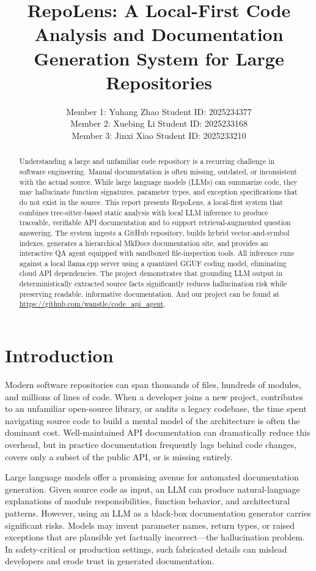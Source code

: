 \documentclass[10pt,twocolumn]{article}
\title{RepoLens: A Local-First Code Analysis and Documentation\\Generation System for Large Repositories}
\author{
Member 1: Yuhang Zhao \quad Student ID: 2025234377 \\
Member 2: Xuebing Li \quad Student ID: 2025233168 \\
Member 3: Jinxi Xiao \quad Student ID: 2025233210 
}
\begin{document}
\maketitle

\begin{abstract}
Understanding a large and unfamiliar code repository is a recurring challenge in software engineering. Manual documentation is often missing, outdated, or inconsistent with the actual source. While large language models (LLMs) can summarize code, they may hallucinate function signatures, parameter types, and exception specifications that do not exist in the source. This report presents RepoLens, a local-first system that combines tree-sitter-based static analysis with local LLM inference to produce traceable, verifiable API documentation and to support retrieval-augmented question answering. The system ingests a GitHub repository, builds hybrid vector-and-symbol indexes, generates a hierarchical MkDocs documentation site, and provides an interactive QA agent equipped with sandboxed file-inspection tools. All inference runs against a local llama.cpp server using a quantized GGUF coding model, eliminating cloud API dependencies. The project demonstrates that grounding LLM output in deterministically extracted source facts significantly reduces hallucination risk while preserving readable, informative documentation. And our project can be found at \url{https://github.com/wanstle/code_api_agent}.
\end{abstract}

\section{Introduction}

Modern software repositories can span thousands of files, hundreds of modules, and millions of lines of code. When a developer joins a new project, contributes to an unfamiliar open-source library, or audits a legacy codebase, the time spent navigating source code to build a mental model of the architecture is often the dominant cost. Well-maintained API documentation can dramatically reduce this overhead, but in practice documentation frequently lags behind code changes, covers only a subset of the public API, or is missing entirely.

Large language models offer a promising avenue for automated documentation generation. Given source code as input, an LLM can produce natural-language explanations of module responsibilities, function behavior, and architectural patterns. However, using an LLM as a black-box documentation generator carries significant risks. Models may invent parameter names, return types, or raised exceptions that are plausible yet factually incorrect---the hallucination problem. In safety-critical or production settings, such fabricated details can mislead developers and erode trust in generated documentation.
\end{document}
